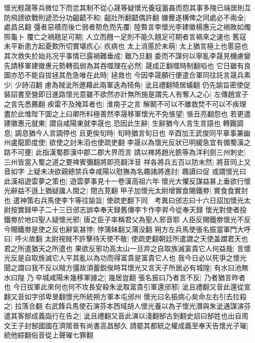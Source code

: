懷光輕晟等兵微位下而忿其制不從心晟等疑懷光養寇蓄姦而怨其事多陵已端居則互防飛謗欲戰則遞恐分功齟齬不和|{
	齟壯所翻齬偶許翻}
嫌釁遂構俾之同處必不兩全|{
	處昌呂翻}
彊者惡積而後亡弱者勢危而先覆|{
	陸䞇言李懷光李建徽楊惠元之禍敗如燭照龜卜}
覆亡之禍翹足可期|{
	人立而翹一足則不能久翹足可期者言禍來之速也}
舊寇未平新患方起憂歎所切實堪疚心|{
	疚病也}
太上消慝於未萌|{
	太上猶言極上也慝惡也}
其次救失於始兆况乎事情已露禍難垂成|{
	難乃旦翻}
委而不謀何以寧亂李晟見機慮變先請移軍建徽惠元勢轉孤弱為其吞噬理在必然|{
	晟成正翻噬時制翻㗖也}
它日雖有良圖亦恐不能自拔拯其危急唯在此時|{
	拯救也}
今因李晟願行便遣合軍同往託言晟兵素少|{
	少詩沼翻}
慮為賊泚所邀藉此兩軍迭為犄角|{
	泚且禮翻犄居蟻翻}
仍先諭旨密使促裝詔書至營即日進路懷光意雖不欲然亦計無所施是謂先人有奪人之心|{
	左傳趙宣子之言先悉薦翻}
疾雷不及掩耳者也|{
	淮南子之言}
解鬭不可以不離救焚不可以不疾理盡於此惟陛下圖之上曰卿所料極善然李晟移軍懷光不免悵望|{
	悵丑亮翻怨也}
若更遣建徽惠元就東|{
	謂自咸陽東就李晟也}
恐因此生辭|{
	生辭猶今人言生言語也}
轉難調息|{
	調息猶今人言調停也}
且更俟旬時|{
	旬時猶言旬日也}
辛酉加王武俊同平章事兼幽州盧龍節度使|{
	欲使之討朱滔也使疏吏翻}
李晟以為懷光反狀已明緩急宜有備蜀漢之路不可壅|{
	此指漢蜀郡漢中郡二郡大界而言}
請以禆將趙光銑等為洋利劍三州刺史|{
	三州皆當入蜀之道之要禆賓彌翻將即亮翻洋音}
祥各將兵五百以防未然|{
	將音同上又音如字}
上疑未决欲親總禁兵幸咸陽以慰撫為名趣諸將進討|{
	趣讀曰促}
或謂懷光曰此漢祖遊雲夢之策也|{
	遊雲夢事見十一卷漢高祖六年}
懷光大懼反謀益甚上垂欲行懷光辭益不遜上猶疑讒人間之|{
	間古莧翻}
甲子加懷光太尉增實食賜鐵劵|{
	實食食實封也}
遣神策右兵馬使李卞等往諭旨|{
	使疏吏翻下同　考異曰邠志曰十六日詔加懷光太尉按實録甲子二十三日邠志誤幸奉天録舊傳李卞作李昇今從奉天録}
懷光對使者投鐵劵於地曰聖人疑懷光邪|{
	唐之臣子率稱君父為聖人邪音耶}
人臣反賜鐵劵懷光不反今賜鐵劵是使之反也辭氣甚悖|{
	悖蒲妺翻又蒲没翻}
朔方左兵馬使張名振當軍門大呼曰|{
	呼火故翻}
太尉視賊不許擊待天使不敬|{
	使疏吏翻朝廷所遣謂之天使盖謂君天也君之所遣猶天之所遣也}
果欲反邪功高太山一旦弃之自取族滅富貴它人何益哉|{
	言懷光反是自取族滅它人平其亂以為功而得富貴是富貴它人也}
我今日必以死爭之懷光聞之謂曰我不反以賊方彊故須蓄鋭俟時耳懷光又言天子所居必有城隍|{
	有水曰池無水曰隍}
乃卒城咸陽未幾移軍據之|{
	幾居豈翻}
張名振曰乃者言不反|{
	乃者猶言昨者也}
今日拔軍此來何也何不攻長安殺朱泚取富貴引軍還邠邪|{
	泚且禮翻又音此還從宣翻又音如字邠卑旻翻懷光所統朔方軍本屯邠州}
懷光曰名振病心矣命左右引去拉殺之|{
	拉落合翻}
右武鋒兵馬使石演芬本西域胡人懷光養以為子懷光潛與朱泚通謀演芬遣其客郜成義詣行在告之|{
	泚且禮翻又音此演以淺翻郜古到翻史炤曰郜姓也出自周文王子封郜國國在濟隂晉有尚書高昌郜久}
請罷其都統之權成義至奉天告懷光子璀|{
	統他綜翻俗音從上聲璀七罪翻}
